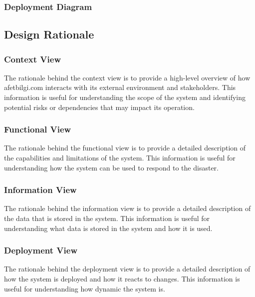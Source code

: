\documentclass[a4paper]{article}
\begin{document}
    \subsubsection{Deployment Diagram}
    \subsection{Design Rationale}
    \subsubsection{Context View}
    The rationale behind the context view is to provide a high-level overview of how afetbilgi.com interacts with its external
    environment and stakeholders. This information is useful for understanding the scope of the system and identifying potential
    risks or dependencies that may impact its operation.
    \subsubsection{Functional View}
    The rationale behind the functional view is to provide a detailed description of the capabilities and limitations of the
    system. This information is useful for understanding how the system can be used to respond to the disaster.
    \subsubsection{Information View}
    The rationale behind the information view is to provide a detailed description of the data that is stored in the system.
    This information is useful for understanding what data is stored in the system and how it is used.
    \subsubsection{Deployment View}
    The rationale behind the deployment view is to provide a detailed description of how the system is deployed and how it reacts
    to changes. This information is useful for understanding how dynamic the system is.
\end{document}
